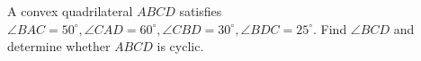 A convex quadrilateral $ABCD$ satisfies $\angle BAC=50^\circ,\angle CAD=60^\circ,\angle CBD=30^\circ,\angle BDC=25^\circ$. Find $\angle BCD$ and determine whether $ABCD$ is cyclic.
